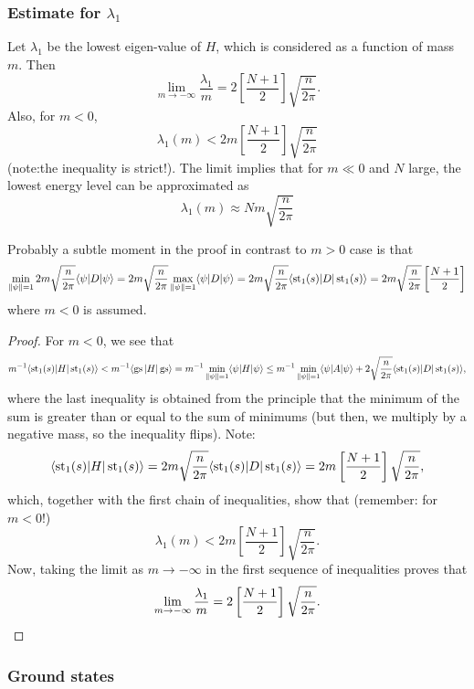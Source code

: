 \subsubsection{Estimate for $\lambda_1$}
\begin{proposition}
Let $\lambda_1$ be the lowest eigen-value of $H$, which is considered as a function of mass $m$. Then
\[
\lim_{m \rightarrow -\infty} \frac{\lambda_1}{m} = 2 \left[\frac{N+1}{2}\right] \sqrt{\frac{n}{2\pi}}.
\]
Also, for $m < 0$,
\[
\lambda_1(m) < 2m \left[\frac{N+1}{2}\right] \sqrt{\frac{n}{2\pi}}
\]
(note:the inequality is strict!). The limit implies that for $m \ll 0$ and $N$ large, the lowest energy level can be approximated as
\[
\lambda_1(m) \approx Nm \sqrt{\frac{n}{2\pi}}
\]
\end{proposition}
Probably a subtle moment in the proof in contrast to $m > 0$ case is that 
\[\min_{\|\psi\| = 1} 2m\sqrt{\frac{n}{2\pi}} \langle \psi | D|\psi\rangle = 2m\sqrt{\frac{n}{2\pi}}\max_{\|\psi\| = 1}  \langle \psi | D|\psi\rangle = 2m\sqrt{\frac{n}{2\pi}}\langle \operatorname{st}_1(s) | D|\operatorname{st}_1(s)\rangle =  2m\sqrt{\frac{n}{2\pi}}\left[\frac{N+1}{2}\right]\]
where $m < 0$ is assumed.
\begin{proof}
For $m < 0$, we see that
\[
m^{-1}\langle \operatorname{st}_1(s)|H|\operatorname{st}_1(s)\rangle < m^{-1} \langle \operatorname{gs} |H|\operatorname{gs} \rangle = m^{-1} \min_{\|\psi\|=1} \langle \psi |H|\psi\rangle \leq m^{-1} \min_{\|\psi\|=1} \langle \psi|A|\psi\rangle + 2\sqrt{\frac{n}{2\pi}} \langle \operatorname{st}_1(s)|D|\operatorname{st}_1(s)\rangle,
\]
where the last inequality is obtained from the principle that the minimum of the sum is greater than or equal to the sum of minimums (but then, we multiply by a negative mass, so the inequality flips). Note:
\[
\langle \operatorname{st}_1(s)|H|\operatorname{st}_1(s)\rangle = 2m \sqrt{\frac{n}{2\pi}} \langle \operatorname{st}_1(s)|D|\operatorname{st}_1(s)\rangle = 2m \left[\frac{N+1}{2}\right] \sqrt{\frac{n}{2\pi}},
\]
which, together with the first chain of inequalities, show that (remember: for $m < 0$!)
\[
\lambda_1(m) < 2m \left[\frac{N+1}{2}\right] \sqrt{\frac{n}{2\pi}}.
\]
Now, taking the limit as $m \rightarrow -\infty$ in the first sequence of inequalities proves that
\[
\lim_{m \rightarrow -\infty} \frac{\lambda_1}{m} = 2 \left[\frac{N+1}{2}\right] \sqrt{\frac{n}{2\pi}}.\qedhere
\]
\end{proof}

\subsubsection{Ground states}

